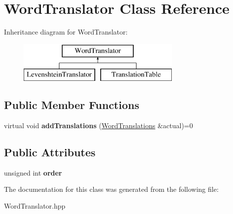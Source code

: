 \hypertarget{classWordTranslator}{}\section{Word\+Translator Class Reference}
\label{classWordTranslator}
Inheritance diagram for Word\+Translator\+:\begin{figure}[H]
\begin{center}
\leavevmode
\includegraphics[height=2.000000cm]{classWordTranslator}
\end{center}
\end{figure}
\subsection*{Public Member Functions}
\begin{DoxyCompactItemize}
\item 
\mbox{\label{classWordTranslator_a21d741b1316bdf315a4c9346900e1846}} 
virtual void {\bfseries add\+Translations} (\hyperlink{classWordTranslations}{Word\+Translations} \&actual)=0
\end{DoxyCompactItemize}
\subsection*{Public Attributes}
\begin{DoxyCompactItemize}
\item 
\mbox{\label{classWordTranslator_a179d2bbd6de97dc89397ed0b6322de76}} 
unsigned int {\bfseries order}
\end{DoxyCompactItemize}


The documentation for this class was generated from the following file\+:\begin{DoxyCompactItemize}
\item 
Word\+Translator.\+hpp\end{DoxyCompactItemize}

